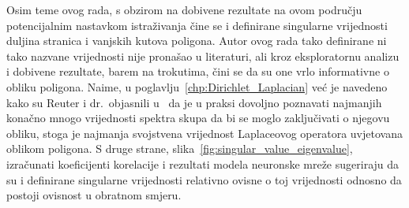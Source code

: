 \par

Osim teme ovog rada, s obzirom na dobivene rezultate na ovom području potencijalnim nastavkom istraživanja čine se i definirane singularne vrijednosti duljina stranica i vanjskih kutova poligona. Autor ovog rada tako definirane ni tako nazvane vrijednosti nije pronašao u literaturi, ali kroz eksploratornu analizu i dobivene rezultate, barem na trokutima, čini se da su one vrlo informativne o obliku poligona. Naime, u poglavlju~\ref{chp:Dirichlet_Laplacian} već je navedeno kako su Reuter i dr.\ objasnili u~\cite{bib:Reuter09} da je u praksi dovoljno poznavati najmanjih konačno mnogo vrijednosti spektra skupa da bi se moglo zaključivati o njegovu obliku, stoga je najmanja svojstvena vrijednost Laplaceovog operatora uvjetovana oblikom poligona. S druge strane, slika~\ref{fig:singular_value_eigenvalue}, izračunati koeficijenti korelacije i rezultati modela neuronske mreže sugeriraju da su i definirane singularne vrijednosti relativno ovisne o toj vrijednosti odnosno da postoji ovisnost u obratnom smjeru.

\par
